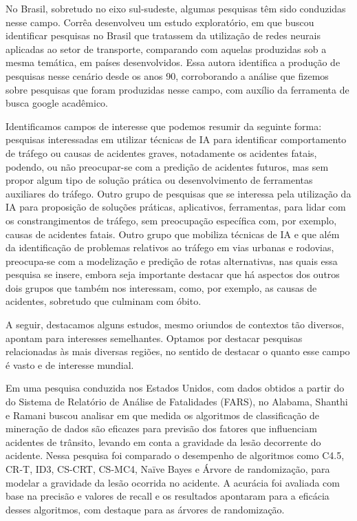 No Brasil, sobretudo no eixo sul-sudeste, algumas pesquisas têm sido conduzidas nesse campo. Corrêa \cite{correa2008aplicaccao} desenvolveu um estudo exploratório, em que buscou identificar pesquisas no Brasil que tratassem da utilização de redes neurais aplicadas ao setor de transporte, comparando com aquelas produzidas sob a mesma temática, em países desenvolvidos. Essa autora identifica a produção de pesquisas nesse cenário desde os anos 90, corroborando a análise que fizemos sobre pesquisas que foram produzidas nesse campo, com auxílio da ferramenta de busca google acadêmico.

Identificamos campos de interesse que podemos resumir da seguinte forma: pesquisas interessadas em utilizar técnicas de IA para identificar comportamento de tráfego ou causas de acidentes graves, notadamente os acidentes fatais, podendo, ou não preocupar-se com a predição de acidentes futuros, mas sem propor algum tipo de solução prática ou desenvolvimento de ferramentas auxiliares do tráfego. Outro grupo de pesquisas que se interessa pela utilização da IA para proposição de soluções práticas, aplicativos, ferramentas, para lidar com os constrangimentos de tráfego, sem preocupação específica com, por exemplo, causas de acidentes fatais. Outro grupo que mobiliza técnicas de IA e que além da identificação de problemas relativos ao tráfego em vias urbanas e rodovias, preocupa-se com a modelização e predição de rotas alternativas, nas quais essa pesquisa se insere, embora seja importante destacar que há aspectos dos outros dois grupos que também nos interessam, como, por exemplo, as causas de acidentes, sobretudo que culminam com óbito. 

A seguir, destacamos alguns estudos, mesmo oriundos de contextos tão diversos, apontam para interesses semelhantes. Optamos por destacar pesquisas relacionadas às mais diversas regiões, no sentido de destacar o quanto esse campo é vasto e de interesse mundial.

Em uma pesquisa conduzida nos Estados Unidos, com dados obtidos a partir do do Sistema de Relatório de Análise de Fatalidades (FARS), no Alabama, Shanthi e Ramani \cite{shanthi2012feature} buscou analisar em que medida os algoritmos de classificação de mineração de dados são eficazes para previsão dos fatores que influenciam acidentes de trânsito, levando em conta a gravidade da lesão decorrente do acidente. Nessa pesquisa foi comparado o desempenho de algoritmos como C4.5, CR-T, ID3, CS-CRT, CS-MC4, Naïve Bayes e Árvore de randomização, para modelar a gravidade da lesão ocorrida no acidente. A acurácia foi avaliada com base na precisão e valores de recall e os resultados apontaram para a eficácia desses algoritmos, com destaque para as árvores de randomização.

